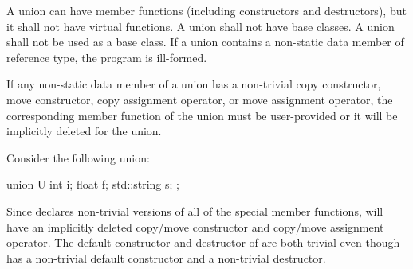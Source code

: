 \pnum
{}%
%
%
A union can have member functions (including constructors and destructors),
%
but it shall not have virtual functions. A union shall not have
base classes. A union shall not be used as a base class.
%
If a union contains a non-static data member of
reference type, the program is ill-formed.
\begin{note}
If any non-static data member of a union has a non-trivial
copy constructor,
move constructor,
copy assignment operator, or
move assignment operator,
the corresponding member function
of the union must be user-provided or it will
be implicitly deleted for the union.
\begin{example}
Consider the following union:
\begin{codeblock}
union U {
  int i;
  float f;
  std::string s;
};
\end{codeblock}
Since  declares non-trivial versions of all of the special
member functions,  will have an implicitly deleted
copy/move constructor and copy/move assignment operator.
The default constructor and destructor of  are both trivial
even though  has
a non-trivial default constructor and a non-trivial destructor.
\end{example}
\end{note}

